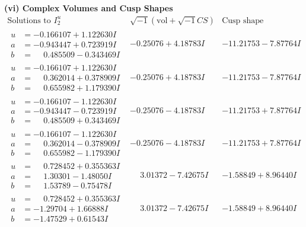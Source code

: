 \documentclass[1p]{elsarticle_modified}
\theoremstyle{definition}
\newcommand{\I}{\sqrt{-1}}
\begin{document}
\newpage\flushleft \textbf{(vi) Complex Volumes and Cusp Shapes}
$$\begin{array}{c|c|c}  
\text{Solutions to }I^u_{2}& \I (\text{vol} + \sqrt{-1}CS) & \text{Cusp shape}\\
 \hline 
\begin{aligned}
u &= -0.166107 + 1.122630 I \\
a &= -0.943447 + 0.723919 I \\
b &= \phantom{-}0.485509 - 0.343469 I\end{aligned}
 & -0.25076 + 4.18783 I & -11.21753 - 7.87764 I \\ \hline\begin{aligned}
u &= -0.166107 + 1.122630 I \\
a &= \phantom{-}0.362014 + 0.378909 I \\
b &= \phantom{-}0.655982 + 1.179390 I\end{aligned}
 & -0.25076 + 4.18783 I & -11.21753 - 7.87764 I \\ \hline\begin{aligned}
u &= -0.166107 - 1.122630 I \\
a &= -0.943447 - 0.723919 I \\
b &= \phantom{-}0.485509 + 0.343469 I\end{aligned}
 & -0.25076 - 4.18783 I & -11.21753 + 7.87764 I \\ \hline\begin{aligned}
u &= -0.166107 - 1.122630 I \\
a &= \phantom{-}0.362014 - 0.378909 I \\
b &= \phantom{-}0.655982 - 1.179390 I\end{aligned}
 & -0.25076 - 4.18783 I & -11.21753 + 7.87764 I \\ \hline\begin{aligned}
u &= \phantom{-}0.728452 + 0.355363 I \\
a &= \phantom{-}1.30301 - 1.48050 I \\
b &= \phantom{-}1.53789 - 0.75478 I\end{aligned}
 & \phantom{-}3.01372 - 7.42675 I & -1.58849 + 8.96440 I \\ \hline\begin{aligned}
u &= \phantom{-}0.728452 + 0.355363 I \\
a &= -1.29704 + 1.66888 I \\
b &= -1.47529 + 0.61543 I\end{aligned}
 & \phantom{-}3.01372 - 7.42675 I & -1.58849 + 8.96440 I \\ \hline\begin{aligned}

\end{aligned}
\end{array}$$
\end{document}
